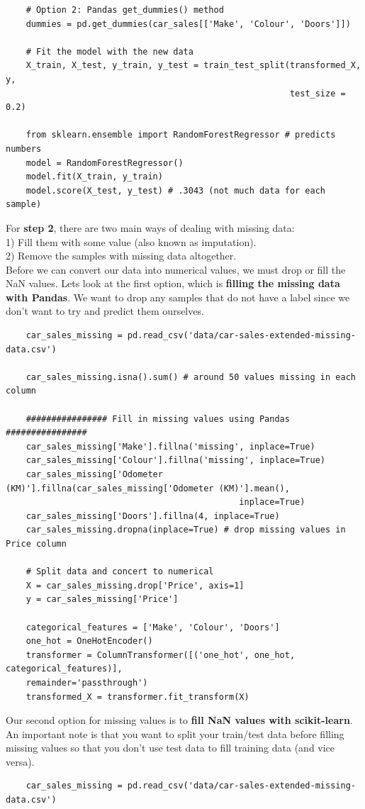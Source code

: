 \documentclass[11pt, a4paper]{article}
\begin{document}
\begin{spacing}{1.1}
\begin{lstlisting}
	# Option 2: Pandas get_dummies() method
	dummies = pd.get_dummies(car_sales[['Make', 'Colour', 'Doors']])
	
	# Fit the model with the new data
	X_train, X_test, y_train, y_test = train_test_split(transformed_X, y, 
	                                                    test_size = 0.2)
	
	from sklearn.ensemble import RandomForestRegressor # predicts numbers
	model = RandomForestRegressor()
	model.fit(X_train, y_train)
	model.score(X_test, y_test)	# .3043 (not much data for each sample)\end{lstlisting} \newpage

	\noindent For \textbf{step 2}, there are two main ways of dealing with missing data: \\
	\hspace*{2mm} 1) Fill them with some value (also known as imputation). \\
	\hspace*{2mm} 2) Remove the samples with missing data altogether. \vspace*{1.5mm} \\
	Before we can convert our data into numerical values, we must drop or fill the NaN values. Lets look at the first option, which is \textbf{filling the missing data with Pandas}. We want to drop any samples that do not have a label since we don't want to try and predict them ourselves.
	\begin{lstlisting}
	car_sales_missing = pd.read_csv('data/car-sales-extended-missing-data.csv') 
	
	car_sales_missing.isna().sum() # around 50 values missing in each column
	
	################ Fill in missing values using Pandas ################
	car_sales_missing['Make'].fillna('missing', inplace=True)
	car_sales_missing['Colour'].fillna('missing', inplace=True)
	car_sales_missing['Odometer (KM)'].fillna(car_sales_missing['Odometer (KM)'].mean(), 
	                                          inplace=True)
	car_sales_missing['Doors'].fillna(4, inplace=True)
	car_sales_missing.dropna(inplace=True) # drop missing values in Price column
	
	# Split data and concert to numerical
	X = car_sales_missing.drop['Price', axis=1]
	y = car_sales_missing['Price']
	
	categorical_features = ['Make', 'Colour', 'Doors']
	one_hot = OneHotEncoder()
	transformer = ColumnTransformer([('one_hot', one_hot, categorical_features)], 
	remainder='passthrough')
	transformed_X = transformer.fit_transform(X) \end{lstlisting} \vspace*{1mm}
	Our second option for missing values is to \textbf{fill NaN values with scikit-learn}. An important note is that you want to split your train/test data before filling missing values so that you don't use test data to fill training data (and vice versa). 
	\begin{lstlisting}
	car_sales_missing = pd.read_csv('data/car-sales-extended-missing-data.csv') 	
	

\end{lstlisting}
\end{spacing}
\end{document}
